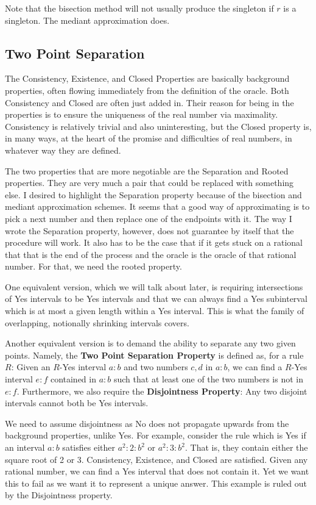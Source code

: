 \documentclass[12pt]{article}
\theoremstyle{remark}
\begin{document}
Note that the bisection method will not usually produce the singleton if $r$ is a singleton. The mediant approximation does. 

\subsection{Two Point Separation}

The Consistency, Existence, and Closed Properties are basically background properties, often flowing immediately from the definition of the oracle. Both Consistency and Closed are often just added in. Their reason for being in the properties is to ensure the uniqueness of the real number via maximality. Consistency is relatively trivial and also uninteresting, but the Closed property is, in many ways, at the heart of the promise and difficulties of real numbers, in whatever way they are defined. 

The two properties that are more negotiable are the Separation and Rooted properties. They are very much a pair that could be replaced with something else. I desired to highlight the Separation property because of the bisection and mediant approximation schemes. It seems that a good way of approximating is to pick a next number and then replace one of the endpoints with it. The way I wrote the Separation property, however, does not guarantee by itself that the procedure will work. It also has to be the case that if it gets stuck on a rational that that is the end of the process and the oracle is the oracle of that rational number. For that, we need the rooted property. 

One equivalent version, which we will talk about later, is requiring intersections of Yes intervals to be Yes intervals and that we can always find a Yes subinterval which is at most a given length within a Yes interval. This is what the family of overlapping, notionally shrinking intervals covers. 

Another equivalent version is to demand the ability to separate any two given points. Namely, the \textbf{Two Point Separation Property} is defined as, for a rule $R$: Given an $R$-Yes interval $a:b$ and two numbers $c,d$ in $a:b$, we can find a $R$-Yes interval $e:f$ contained in $a:b$ such that at least one of the two numbers is not in $e:f$. Furthermore, we also require the \textbf{Disjointness Property}: Any two disjoint intervals cannot both be Yes intervals. 

We need to assume disjointness as No does not propagate upwards from the background properties, unlike Yes. For example, consider the rule which is Yes if an interval $a:b$ satisfies either $a^2:2:b^2$ or $a^2:3:b^2$. That is, they contain either the square root of 2 or 3. Consistency, Existence, and Closed are satisfied. Given any rational number, we can find a Yes interval that does not contain it. Yet we want this to fail as we want it to represent a unique answer. This example is ruled out by the Disjointness property. 
\end{document}
